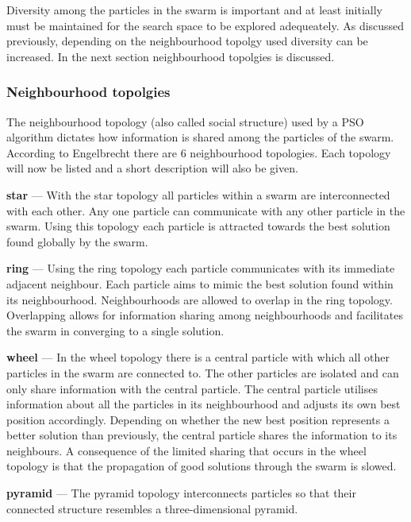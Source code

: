 Diversity among the particles in the swarm is important and at least initially must be maintained for the search space to be explored adequeately. As discussed previously, depending on the neighbourhood topolgy used diversity can be increased. In the next section neighbourhood topolgies is discussed.
\subsubsection{Neighbourhood topolgies}
The neighbourhood topology (also called social structure) used by a \gls{PSO} algorithm dictates how information is shared among the particles of the swarm. According to Engelbrecht\cite{FundamentalSwarm} there are 6 neighbourhood topologies. Each topology will now be listed and a short description will also be given.
\begin{description}
\item{\textbf{star}} --- With the star topology all particles within a swarm are interconnected with each other. Any one particle can communicate with any other particle in the swarm\cite{FundamentalSwarm}. Using this topology each particle is attracted towards the best solution found globally by the swarm\cite{FundamentalSwarm}. 
\item{\textbf{ring}} --- Using the ring topology each particle communicates with its immediate adjacent neighbour\cite{FundamentalSwarm}. Each particle aims to mimic the best solution found within its neighbourhood\cite{FundamentalSwarm}. Neighbourhoods are allowed to overlap in the ring topology\cite{FundamentalSwarm}. Overlapping allows for information sharing among neighbourhoods and facilitates the swarm in converging to a single solution\cite{FundamentalSwarm}. 
\item{\textbf{wheel}} --- In the wheel topology there is a central particle with which all other particles in the swarm are connected to\cite{FundamentalSwarm}. The other particles are isolated and can only share information with the central particle\cite{FundamentalSwarm}. The central particle utilises information about all the particles in its neighbourhood and adjusts its own best position accordingly\cite{FundamentalSwarm}. Depending on whether the new best position represents a better solution than previously, the central particle shares the information to its neighbours\cite{FundamentalSwarm}. A consequence of the limited sharing that occurs in the wheel topology is that the propagation of good solutions through the swarm is slowed\cite{FundamentalSwarm}.
\item{\textbf{pyramid}} --- The pyramid topology interconnects particles so that their connected structure resembles a three-dimensional pyramid\cite{FundamentalSwarm}.

\end{description}
